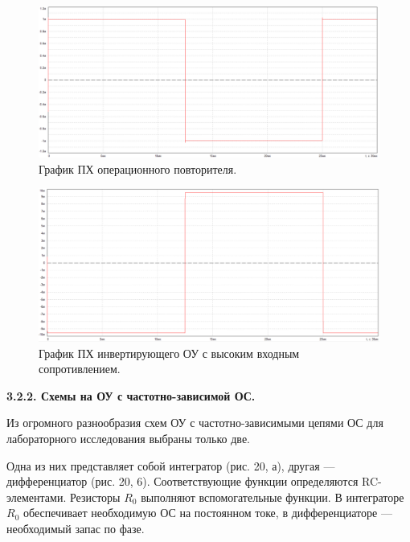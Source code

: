 \documentclass[a4paper,14pt]{extarticle}
\begin{document}
    \begin{figure}[h!]
        \begin{center}
            \includegraphics[scale=0.25]{16.png}
        \end{center}
        \vspace{-0.7cm}
        \caption{График ПХ операционного повторителя.}
    \end{figure}

    \begin{figure}[h!]
        \begin{center}
            \includegraphics[scale=0.25]{17.png}
        \end{center}
        \vspace{-0.7cm}
        \caption{График ПХ инвертирующего ОУ с высоким входным сопротивлением.}
    \end{figure}

    \begin{center}
        \textbf{3.2.2. Схемы на ОУ с частотно-зависимой ОС.}
    \end{center}

    Из огромного разнообразия схем ОУ с частотно-зависимыми цепями ОС для 
    лабораторного исследования выбраны только две.

    Одна из них представляет собой интегратор (рис. 20, а), 
    другая — дифференциатор (рис. 20, 6). Соответствующие функции 
    определяются RC-элементами. Резисторы $R_0$ выполняют вспомогательные 
    функции. В интеграторе $R_0$ обеспечивает необходимую ОС на постоянном 
    токе, в дифференциаторе — необходимый запас по фазе.
\end{document}
